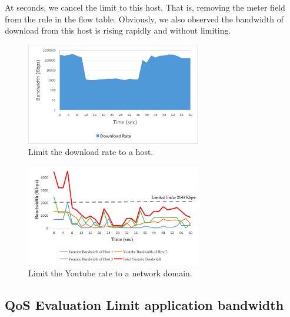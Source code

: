 \documentclass[journal]{IEEEtran}
\begin{document}
At  seconds, we cancel the limit to this host. That is, removing the meter field from the rule in the flow table. Obviously, we also observed the bandwidth of download from this host is rising rapidly and without limiting.

\begin{figure}[!t]
\centering
\includegraphics[width=3in]{./figures/qos_limit_host}
\caption{Limit the download rate to a host.}
\label{fig:qos_limit_host}
\end{figure}

\begin{figure}[!t]
\centering
\includegraphics[width=3in]{./figures/mft_qos_rate_domain_app}
\caption{Limit the Youtube rate to a network domain.}
\label{fig:mft_qos_rate_domain_app}
\end{figure}

\subsection{QoS Evaluation Limit application bandwidth}
\end{document}
